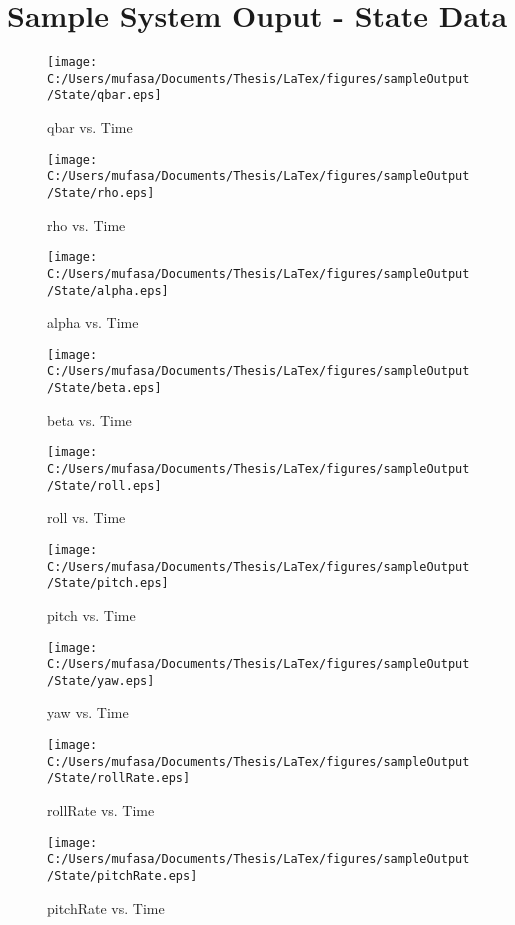 \section{Sample System Ouput - State Data}
\begin{figure}[]
	\centering
	\caption{qbar vs. Time}
		\texttt{[image: C:/Users/mufasa/Documents/Thesis/LaTex/figures/sampleOutput/State/qbar.eps]}
\end{figure}
\begin{figure}[]
	\centering
	\caption{rho vs. Time}
		\texttt{[image: C:/Users/mufasa/Documents/Thesis/LaTex/figures/sampleOutput/State/rho.eps]}
\end{figure}
\clearpage
\begin{figure}[]
	\centering
	\caption{alpha vs. Time}
		\texttt{[image: C:/Users/mufasa/Documents/Thesis/LaTex/figures/sampleOutput/State/alpha.eps]}
\end{figure}
\begin{figure}[]
	\centering
	\caption{beta vs. Time}
		\texttt{[image: C:/Users/mufasa/Documents/Thesis/LaTex/figures/sampleOutput/State/beta.eps]}
\end{figure}
\begin{figure}[]
	\centering
	\caption{roll vs. Time}
		\texttt{[image: C:/Users/mufasa/Documents/Thesis/LaTex/figures/sampleOutput/State/roll.eps]}
\end{figure}
\begin{figure}[]
	\centering
	\caption{pitch vs. Time}
		\texttt{[image: C:/Users/mufasa/Documents/Thesis/LaTex/figures/sampleOutput/State/pitch.eps]}
\end{figure}
\begin{figure}[]
	\centering
	\caption{yaw vs. Time}
		\texttt{[image: C:/Users/mufasa/Documents/Thesis/LaTex/figures/sampleOutput/State/yaw.eps]}
\end{figure}
\begin{figure}[]
	\centering
	\caption{rollRate vs. Time}
		\texttt{[image: C:/Users/mufasa/Documents/Thesis/LaTex/figures/sampleOutput/State/rollRate.eps]}
\end{figure}
\begin{figure}[]
	\centering
	\caption{pitchRate vs. Time}
		\texttt{[image: C:/Users/mufasa/Documents/Thesis/LaTex/figures/sampleOutput/State/pitchRate.eps]}
\end{figure}
